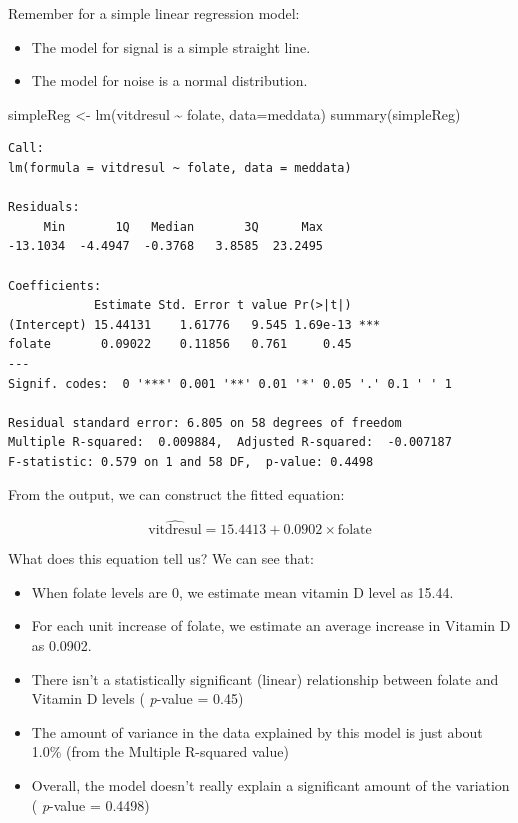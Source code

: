 \documentclass[
  oneside]{krantz}
\newenvironment{Shaded}{\begin{snugshade}}{\end{snugshade}}
\newcommand{\AttributeTok}[1]{\textcolor[rgb]{0.77,0.63,0.00}{#1}}
\newcommand{\FunctionTok}[1]{\textcolor[rgb]{0.00,0.00,0.00}{#1}}
\newcommand{\NormalTok}[1]{#1}
\newcommand{\OtherTok}[1]{\textcolor[rgb]{0.56,0.35,0.01}{#1}}
\newcommand{\SpecialCharTok}[1]{\textcolor[rgb]{0.00,0.00,0.00}{#1}}
\providecommand{\tightlist}{%
  \setlength{\itemsep}{0pt}\setlength{\parskip}{0pt}}
\begin{document}
Remember for a simple linear regression model:

\begin{itemize}
\tightlist
\item
  The model for signal is a simple straight line.
\item
  The model for noise is a normal distribution.
\end{itemize}

\begin{Shaded}
\begin{Highlighting}[]
\NormalTok{simpleReg }\OtherTok{\textless{}{-}} \FunctionTok{lm}\NormalTok{(vitdresul }\SpecialCharTok{\textasciitilde{}}\NormalTok{ folate, }\AttributeTok{data=}\NormalTok{meddata)}
\FunctionTok{summary}\NormalTok{(simpleReg)}
\end{Highlighting}
\end{Shaded}

\begin{verbatim}
Call:
lm(formula = vitdresul ~ folate, data = meddata)

Residuals:
     Min       1Q   Median       3Q      Max 
-13.1034  -4.4947  -0.3768   3.8585  23.2495 

Coefficients:
            Estimate Std. Error t value Pr(>|t|)    
(Intercept) 15.44131    1.61776   9.545 1.69e-13 ***
folate       0.09022    0.11856   0.761     0.45    
---
Signif. codes:  0 '***' 0.001 '**' 0.01 '*' 0.05 '.' 0.1 ' ' 1

Residual standard error: 6.805 on 58 degrees of freedom
Multiple R-squared:  0.009884,  Adjusted R-squared:  -0.007187 
F-statistic: 0.579 on 1 and 58 DF,  p-value: 0.4498
\end{verbatim}

From the output, we can construct the fitted equation:

\[\hat {\textrm{vitdresul}} = 15.4413 + 0.0902 \times\textrm{folate}\]

What does this equation tell us? We can see that:

\begin{itemize}
\item
  When folate levels are 0, we estimate mean vitamin D level as 15.44.
\item
  For each unit increase of folate, we estimate an average increase in Vitamin D as 0.0902.
\item
  There isn't a statistically significant (linear) relationship between folate and Vitamin D levels ( \emph{p}-value = 0.45)
\item
  The amount of variance in the data explained by this model is just about 1.0\% (from the Multiple R-squared value)
\item
  Overall, the model doesn't really explain a significant amount of the variation ( \emph{p}-value = 0.4498)
\end{itemize}
\end{document}

